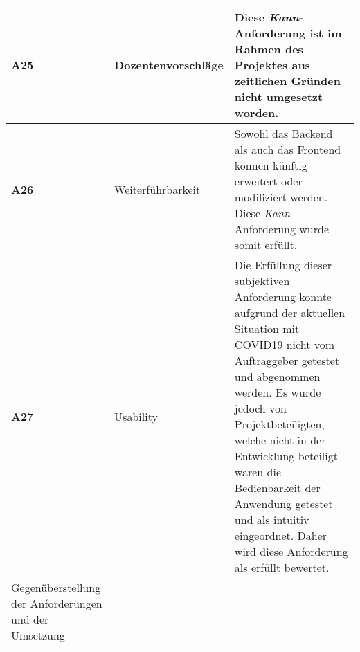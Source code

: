 \begin{longtable}[H]{|p{}|p{}|p{}|}
	\parbox[t]{3cm}	{\textbf{A25}} & Dozentenvorschläge & Diese \textit{Kann}-Anforderung ist im Rahmen des Projektes aus zeitlichen Gründen nicht umgesetzt worden.\\ \hline  %
	\parbox[t]{3cm}	{\textbf{A26}} & Weiterführbarkeit & Sowohl das Backend als auch das Frontend können künftig erweitert oder modifiziert werden. Diese \textit{Kann}-Anforderung wurde somit erfüllt.\\ \hline %
	\parbox[t]{3cm}	{\textbf{A27}} & Usability & Die Erfüllung dieser subjektiven Anforderung konnte aufgrund der aktuellen Situation mit COVID19 nicht vom Auftraggeber getestet und abgenommen werden. Es wurde jedoch von Projektbeteiligten, welche nicht in der Entwicklung beteiligt waren die Bedienbarkeit der Anwendung getestet und als intuitiv eingeordnet. Daher wird diese Anforderung als erfüllt bewertet.\\ \hline %
	\captionsetup{format=hang}
	\caption{\label{tab:erfanf}Gegenüberstellung der Anforderungen und der Umsetzung \\}
\end{longtable}
